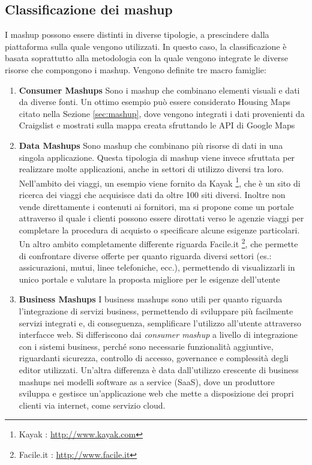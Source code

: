 \subsection{Classificazione dei mashup\label{sec:mashup-classification}}
I mashup possono essere distinti in diverse tipologie, a prescindere dalla piattaforma sulla quale vengono utilizzati.
In questo caso, la classificazione è basata soprattutto alla metodologia con la quale vengono integrate le diverse risorse che compongono i mashup. Vengono definite tre macro famiglie:
\begin{enumerate}
	\item \textbf{Consumer Mashups} Sono i mashup che combinano elementi visuali e dati da diverse fonti. Un ottimo esempio può essere considerato Housing Maps citato nella Sezione \ref{sec:mashup}, dove vengono integrati i dati provenienti da Craigslist e mostrati sulla mappa creata sfruttando le API di Google Maps
	\item \textbf{Data Mashups} Sono mashup che combinano più risorse di dati in una singola applicazione. Questa tipologia di mashup viene invece sfruttata per realizzare molte applicazioni, anche in settori di utilizzo diversi tra loro.
	Nell'ambito dei viaggi, un esempio viene fornito da Kayak \footnote{Kayak : \url{http://www.kayak.com}}, che è un sito di ricerca dei viaggi che acquisisce dati da oltre 100 siti diversi. Inoltre non vende direttamente i contenuti ai fornitori, ma si propone come un portale attraverso il quale i clienti possono essere dirottati verso le agenzie viaggi per completare la procedura di acquisto o specificare alcune esigenze particolari.
	Un altro ambito completamente differente riguarda Facile.it \footnote{Facile.it : \url{http://www.facile.it}}, che permette di confrontare diverse offerte per quanto riguarda diversi settori (es.: assicurazioni, mutui, linee telefoniche, ecc.), permettendo di visualizzarli in unico portale e valutare la proposta migliore per le esigenze dell'utente
	\item \textbf{Business Mashups} I business mashups sono utili per quanto riguarda l'integrazione di servizi business, permettendo di sviluppare più facilmente servizi integrati e, di conseguenza, semplificare l'utilizzo all'utente attraverso interfacce web. Si differiscono dai \emph{consumer mashup} a livello di integrazione con i sistemi business, perché sono necessarie funzionalità aggiuntive, riguardanti sicurezza, controllo di accesso, governance e complessità degli editor utilizzati. Un'altra differenza è data dall'utilizzo crescente di business mashups nei modelli software as a service (SaaS), dove un produttore sviluppa e gestisce un'applicazione web che mette a disposizione dei propri clienti via internet, come servizio cloud.
\end{enumerate}

